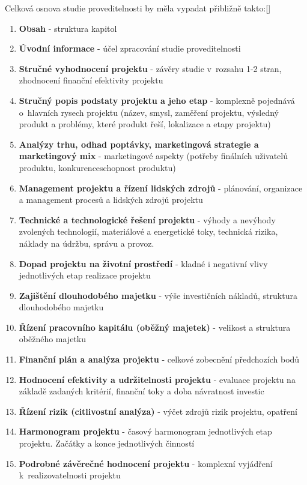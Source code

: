 \documentclass[
	11pt, oneside, printed, draft, 
	table,   %
	lof,     %
	lot     %
]{fithesis3}
\newcommand{\citepages}[2]{[\cite[#1]{#2}]}
\newcommand{\bold}[1]{\textbf{#1}}
\newcommand{\mezera}{\bigskip}
\begin{document}
{Celková osnova studie proveditelnosti by měla vypadat přibližně takto:\citepages{8-14}{Sieber2004} 
\mezera
\begin{enumerate}
\item \bold{Obsah} - struktura kapitol
\item \bold{Úvodní informace} - účel zpracování studie proveditelnosti
\item \bold{Stručné vyhodnocení projektu} - závěry studie v~rozsahu 1-2 stran, zhodnocení finanční efektivity projektu
\item \bold{Stručný popis podstaty projektu a jeho etap} - komplexně pojednává o~hlavních rysech projektu (název, smysl, zaměření projektu, výsledný produkt a problémy, které produkt řeší, lokalizace a etapy projektu)
\item \bold{Analýzy trhu, odhad poptávky, marketingová strategie a marketingový mix} - marketingové aspekty (potřeby finálních uživatelů produktu, konkurenceschopnost produktu)
\item \bold{Management projektu a řízení lidských zdrojů} - plánování, organizace a management procesů a lidských zdrojů projektu 
\item \bold{Technické a technologické řešení projektu} - výhody a nevýhody zvolených technologií, materiálové a energetické toky, technická rizika, náklady na údržbu, správu a provoz.
\item \bold{Dopad projektu na životní prostředí} - kladné i negativní vlivy jednotlivých etap realizace projektu
\item \bold{Zajištění dlouhodobého majetku} - výše investičních nákladů, struktura dlouhodobého majetku
\item \bold{Řízení pracovního kapitálu (oběžný majetek)} - velikost a struktura oběžného majetku
\item \bold{Finanční plán a analýza projektu} - celkové zobecnění předchozích bodů
\item \bold{Hodnocení efektivity a udržitelnosti projektu} - evaluace projektu na základě zadaných kritérií, finanční toky a doba návratnost investic
\item \bold{Řízení rizik (citlivostní analýza)} - výčet zdrojů rizik projektu, opatření
\item \bold{Harmonogram projektu} - časový harmonogram jednotlivých etap projektu. Začátky a konce jednotlivých činností
\item \bold{Podrobné závěrečné hodnocení projektu} - komplexní vyjádření k~realizovatelnosti projektu
\end{enumerate}

}
\end{document}
